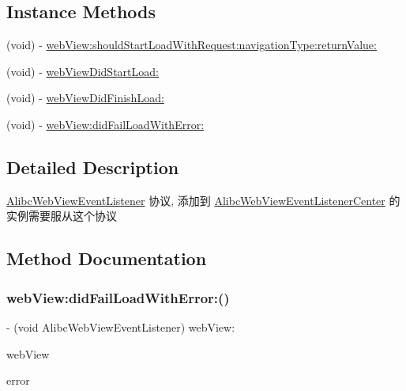 \subsection*{Instance Methods}
\begin{DoxyCompactItemize}
\item 
(void) -\/ \mbox{\hyperlink{protocol_alibc_web_view_event_listener_01-p_afe332be74cc369869586eaf8d4cfddea}{web\+View\+:should\+Start\+Load\+With\+Request\+:navigation\+Type\+:return\+Value\+:}}
\item 
(void) -\/ \mbox{\hyperlink{protocol_alibc_web_view_event_listener_01-p_a2fc3db84e89fcfe3ad9cb2e414ac94d2}{web\+View\+Did\+Start\+Load\+:}}
\item 
(void) -\/ \mbox{\hyperlink{protocol_alibc_web_view_event_listener_01-p_a00b82713105e064dbcdfa9e5cf96bfdd}{web\+View\+Did\+Finish\+Load\+:}}
\item 
(void) -\/ \mbox{\hyperlink{protocol_alibc_web_view_event_listener_01-p_a02db5fc3e65223bcacba99b468e37d07}{web\+View\+:did\+Fail\+Load\+With\+Error\+:}}
\end{DoxyCompactItemize}


\subsection{Detailed Description}
\mbox{\hyperlink{class_alibc_web_view_event_listener-p}{Alibc\+Web\+View\+Event\+Listener}} 协议, 添加到 \mbox{\hyperlink{interface_alibc_web_view_event_listener_center}{Alibc\+Web\+View\+Event\+Listener\+Center}} 的实例需要服从这个协议 

\subsection{Method Documentation}
\mbox{\label{protocol_alibc_web_view_event_listener_01-p_a02db5fc3e65223bcacba99b468e37d07}} 
\subsubsection{\texorpdfstring{web\+View\+:did\+Fail\+Load\+With\+Error\+:()}{webView:didFailLoadWithError:()}}
{\footnotesize\ttfamily -\/ (void Alibc\+Web\+View\+Event\+Listener) web\+View\+: \begin{DoxyParamCaption}\item[{(U\+I\+Web\+View $\ast$)}]{web\+View }\item[{didFailLoadWithError:(N\+S\+Error $\ast$)}]{error }\end{DoxyParamCaption}\hspace{0.3cm}{\ttfamily [optional]}}

